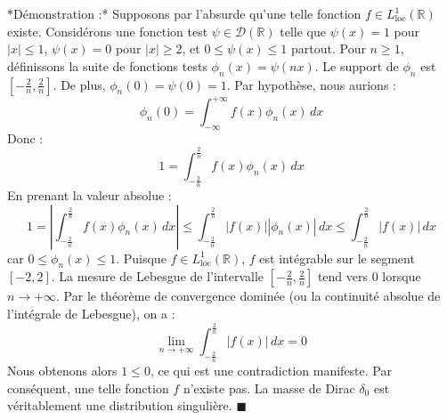 \documentclass[11pt,a4paper]{article}
\begin{document}
*Démonstration :*
Supposons par l'absurde qu'une telle fonction $f \in L^1_{\text{loc}}(\mathbb{R})$ existe.
Considérons une fonction test $\psi \in \mathcal{D}(\mathbb{R})$ telle que $\psi(x) = 1$ pour $|x| \le 1$, $\psi(x) = 0$ pour $|x| \ge 2$, et $0 \le \psi(x) \le 1$ partout.
Pour $n \ge 1$, définissons la suite de fonctions tests $\phi_n(x) = \psi(nx)$.
Le support de $\phi_n$ est $\left[-\frac{2}{n}, \frac{2}{n}\right]$. De plus, $\phi_n(0) = \psi(0) = 1$.
Par hypothèse, nous aurions :
$$ \phi_n(0) = \int_{-\infty}^{+\infty} f(x) \phi_n(x) \, dx $$
Donc :
$$ 1 = \int_{-\frac{2}{n}}^{\frac{2}{n}} f(x) \phi_n(x) \, dx $$
En prenant la valeur absolue :
$$ 1 = \left| \int_{-\frac{2}{n}}^{\frac{2}{n}} f(x) \phi_n(x) \, dx \right| \le \int_{-\frac{2}{n}}^{\frac{2}{n}} |f(x)| |\phi_n(x)| \, dx \le \int_{-\frac{2}{n}}^{\frac{2}{n}} |f(x)| \, dx $$
car $0 \le \phi_n(x) \le 1$.
Puisque $f \in L^1_{\text{loc}}(\mathbb{R})$, $f$ est intégrable sur le segment $[-2, 2]$.
La mesure de Lebesgue de l'intervalle $\left[-\frac{2}{n}, \frac{2}{n}\right]$ tend vers 0 lorsque $n \to +\infty$.
Par le théorème de convergence dominée (ou la continuité absolue de l'intégrale de Lebesgue), on a :
$$ \lim_{n \to +\infty} \int_{-\frac{2}{n}}^{\frac{2}{n}} |f(x)| \, dx = 0 $$
Nous obtenons alors $1 \le 0$, ce qui est une contradiction manifeste.
Par conséquent, une telle fonction $f$ n'existe pas. La masse de Dirac $\delta_0$ est véritablement une distribution singulière.
$\blacksquare$

\begin{center}
\end{center}
\end{document}
